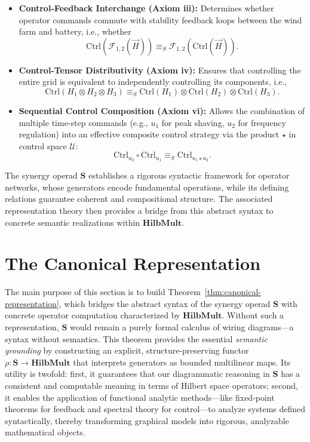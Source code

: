 \documentclass[11pt]{article}
\begin{document}
\begin{itemize}
    \item \textbf{Control-Feedback Interchange (Axiom iii):} 
    Determines whether operator commands commute with stability feedback loops between the wind farm and battery, i.e., whether 
    \[
    \mathrm{Ctrl}(\mathcal{F}_{1,2}(\vec{H})) \equiv_S \mathcal{F}_{1,2}(\mathrm{Ctrl}(\vec{H})).
    \]

    \item \textbf{Control-Tensor Distributivity (Axiom iv):} 
    Ensures that controlling the entire grid is equivalent to independently controlling its components, i.e.,
    \[
    \mathrm{Ctrl}(H_1 \otimes H_2 \otimes H_3) \equiv_S \mathrm{Ctrl}(H_1) \otimes \mathrm{Ctrl}(H_2) \otimes \mathrm{Ctrl}(H_3).
    \]

    \item \textbf{Sequential Control Composition (Axiom vi):} 
    Allows the combination of multiple time-step commands (e.g., $u_1$ for peak shaving, $u_2$ for frequency regulation) into an effective composite control strategy via the product $\star$ in control space $\mathcal{U}$:
    \[
    \mathrm{Ctrl}_{u_2} \circ \mathrm{Ctrl}_{u_1} \equiv_S \mathrm{Ctrl}_{u_1 \star u_2}.
    \]
\end{itemize}


The synergy operad $\mathbf{S}$ establishes a rigorous syntactic framework for operator networks, 
whose generators encode fundamental operations, while its defining relations guarantee coherent 
and compositional structure. The associated representation theory then provides a bridge from 
this abstract syntax to concrete semantic realizations within $\mathbf{HilbMult}$.

\section{The Canonical Representation}\label{sec:The Canonical Representation}

The main purpose of this section is to build Theorem~\ref{thm:canonical-representation}, which bridges the abstract syntax of the synergy operad $\mathbf{S}$ with concrete operator computation characterized by $\mathbf{HilbMult}$. Without such a representation, $\mathbf{S}$ would remain a purely formal calculus of wiring diagrams—a syntax without semantics. This theorem provides the essential \textit{semantic grounding} by constructing an explicit, structure-preserving functor $\rho: \mathbf{S} \to \mathbf{HilbMult}$ that interprets generators as bounded multilinear maps. Its utility is twofold: first, it guarantees that our diagrammatic reasoning in $\mathbf{S}$ has a consistent and computable meaning in terms of Hilbert space operators; second, it enables the application of functional analytic methods—like fixed-point theorems for feedback and spectral theory for control—to analyze systems defined syntactically, thereby transforming graphical models into rigorous, analyzable mathematical objects.
\end{document}
